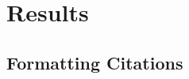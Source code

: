 \documentclass[12pt]{article}
\begin{document}
\section*{Results}
% 



\subsection*{Formatting Citations}
\end{document}
